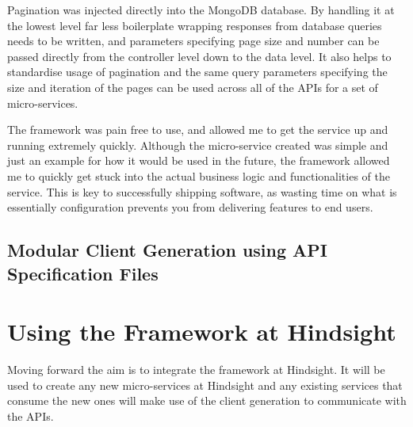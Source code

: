 Pagination was injected directly into the MongoDB database. By handling it at the lowest level far less boilerplate wrapping responses from database queries needs to be written, and parameters specifying page size and number can be passed directly from the controller level down to the data level. It also helps to standardise usage of pagination and the same query parameters specifying the size and iteration of the pages can be used across all of the APIs for a set of micro-services.

The framework was pain free to use, and allowed me to get the service up and running extremely quickly. Although the micro-service created was simple and just an example for how it would be used in the future, the framework allowed me to quickly get stuck into the actual business logic and functionalities of the service. This is key to successfully shipping software, as wasting time on what is essentially configuration prevents you from delivering features to end users.
\subsection{Modular Client Generation using API Specification Files}
\section{Using the Framework at Hindsight}
Moving forward the aim is to integrate the framework at Hindsight. It will be used to create any new micro-services at Hindsight and any existing services that consume the new ones will make use of the client generation to communicate with the APIs.